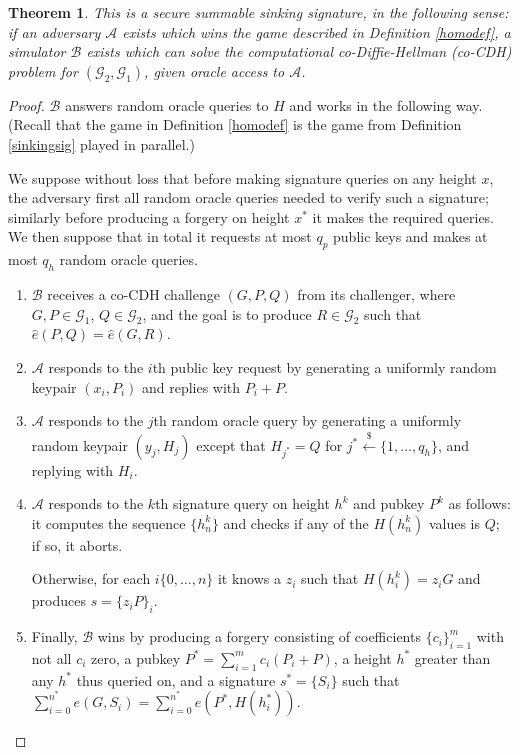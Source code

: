 \documentclass[letterpaper]{article}
\newtheorem{thrm}{Theorem}
\newcommand{\e}{\hat{e}}
\newcommand{\randgets}{\xleftarrow{\$}}
\begin{document}
\begin{thrm} This is a secure summable sinking signature, in the following
sense: if an adversary $\mathcal{A}$ exists which wins the game described
in Definition \ref{homodef}, a simulator $\mathcal{B}$ exists which can solve
the computational co-Diffie-Hellman (co-CDH) problem for $(\mathcal{G}_2,
\mathcal{G}_1)$, given oracle access to $\mathcal{A}$.\end{thrm}
\begin{proof} $\mathcal{B}$ answers random oracle queries to $H$ and
works in the following way. (Recall that the game in Definition
\ref{homodef} is the game from Definition \ref{sinkingsig} played
in parallel.)

We suppose without loss that before making signature queries on any height $x$,
the adversary first all random oracle queries needed to verify such a signature;
similarly before producing a forgery on height $x^*$ it makes the required queries.
We then suppose that in total it requests at most $q_p$ public keys and makes
at most $q_h$ random oracle queries.

\begin{enumerate}
\item $\mathcal{B}$ receives a co-CDH challenge $(G, P, Q)$ from its challenger,
where $G, P\in\mathcal{G}_1$, $Q\in\mathcal{G}_2$, and the goal is to produce
$R\in\mathcal{G}_2$ such that $\e(P, Q) = \e(G, R)$.

\item $\mathcal{A}$ responds to the $i$th public key request by generating
a uniformly random keypair $(x_i, P_i)$ and replies with $P_i + P$.

\item $\mathcal{A}$ responds to the $j$th random oracle query by generating
a uniformly random keypair $(y_j, H_j)$ except that $H_{j^*} = Q$ for
$j^*\randgets\{1,\ldots,q_h\}$, and replying with $H_i$.

\item $\mathcal{A}$ responds to the $k$th signature query on height $h^k$
and pubkey $P^k$ as follows: it computes the sequence $\{h^k_n\}$ and checks
if any of the $H(h^k_n)$ values is $Q$; if so, it aborts.

Otherwise, for each $i\{0,\ldots,n\}$ it knows a $z_i$ such that $H(h^k_i) = z_iG$
and produces $s = \{ z_iP \}_i$.

\item Finally, $\mathcal{B}$ wins by producing a forgery consisting of coefficients
$\{ c_i\}_{i=1}^m$ with not all $c_i$ zero, a pubkey $P^* = \sum_{i=1}^m c_i(P_i + P)$,
a height $h^*$ greater than any $h^*$ thus queried on, and a signature $s^* = \{S_i\}$
such that $\sum_{i=0}^{n^*}e(G, S_i) = \sum_{i=0}^{n^*} e(P^*, H(h^*_i))$.


\end{enumerate}
\end{proof}
\end{document}

